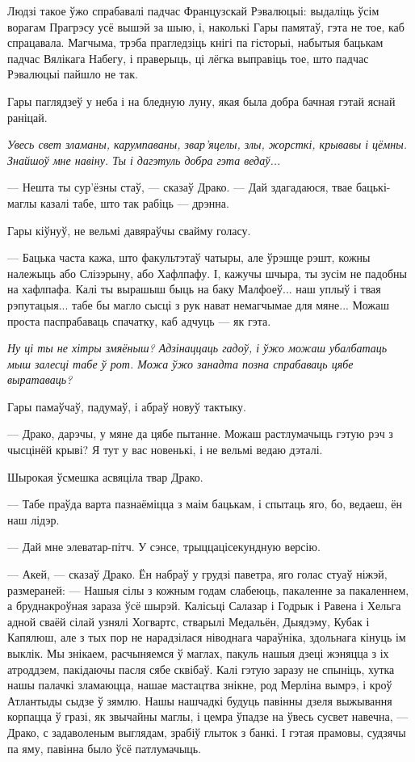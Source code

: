 Людзі такое ўжо спрабавалі падчас Французскай Рэвалюцыі: выдаліць ўсім 
ворагам Прагрэсу усё вышэй за шыю, і, наколькі Гары памятаў, гэта не тое, каб
спрацавала. Магчыма, трэба прагледзіць кнігі па гісторыі, набытыя бацькам падчас
Вялікага Набегу, і праверыць, ці лёгка выправіць тое, што падчас Рэвалюцыі пайшло не так.

Гары паглядзеў у неба і на бледную луну, якая была добра бачная гэтай яснай раніцай.

\emph{Увесь свет зламаны, карумпаваны, звар'яцелы, злы, жорсткі, крывавы і цёмны. 
Знайшоў мне навіну. Ты і дагэтуль добра гэта ведаў...}

--- Нешта ты сур'ёзны стаў, --- сказаў Драко. --- Дай здагадаюся, твае бацькі-маглы
казалі табе, што так рабіць --- дрэнна.

Гары кіўнуў, не вельмі давяраўчы свайму голасу.

--- Бацька часта кажа, што факультэтаў чатыры, але ўрэшце рэшт, кожны належыць або
Слізэрыну, або Хафлпафу. І, кажучы шчыра, ты зусім не падобны на хафлпафа. 
Калі ты вырашыш быць на баку Малфоеў... наш уплыў і твая рэпутацыя...
табе бы магло сысці з рук нават немагчымае для мяне... Можаш проста паспрабаваць
спачатку, каб адчуць --- як гэта.

\emph{Ну ці ты не хітры змяёныш? Адзінаццаць гадоў, і ўжо можаш убалбатаць
мыш залесці табе ў рот. Можа ўжо занадта позна спрабаваць цябе выратаваць?}

Гары памаўчаў, падумаў, і абраў новуў тактыку.

--- Драко, дарэчы, у мяне да цябе пытанне. Можаш растлумачыць гэтую рэч з 
чысцінёй крыві? Я тут у вас новенькі, і не вельмі ведаю дэталі.

Шырокая ўсмешка асвяціла твар Драко.

--- Табе праўда варта пазнаёміцца з маім бацькам, і спытаць яго, бо, ведаеш,
ён наш лідэр.

--- Дай мне элеватар-пітч. У сэнсе, трыццацісекундную версію.

--- Акей, --- сказаў Драко. Ён набраў у грудзі паветра, яго голас стуаў ніжэй,
размераней: --- Нашыя сілы з кожным годам слабеюць, пакаленне за пакаленнем, а
бруднакроўная зараза ўсё шырэй. Калісьці Салазар і Годрык і Равена і Хельга 
адной сваёй сілай узнялі Хогвартс, стварылі Медальён, Дыядэму, Кубак і Капялюш,
але з тых пор не нарадзілася ніводнага чараўніка, здольнага кінуць ім выклік.
Мы знікаем, расчыняемся ў маглах, пакуль нашыя дзеці жэняцца з іх атроддзем,
пакідаючы пасля сябе сквібаў. Калі гэтую заразу не спыніць, хутка
нашы палачкі зламаюцца, нашае мастацтва знікне, род Мерліна 
вымрэ, і кроў Атлантыды сыдзе ў зямлю. Нашы нашчадкі будуць павінны дзеля 
выжывання корпацца ў гразі, як звычайны маглы, і цемра ўпадзе 
на ўвесь сусвет навечна, --- Драко, с задаволеным выглядам, зрабіў глыток з 
банкі. І гэтая прамовы, судзячы па яму, павінна было ўсё патлумачыць.

